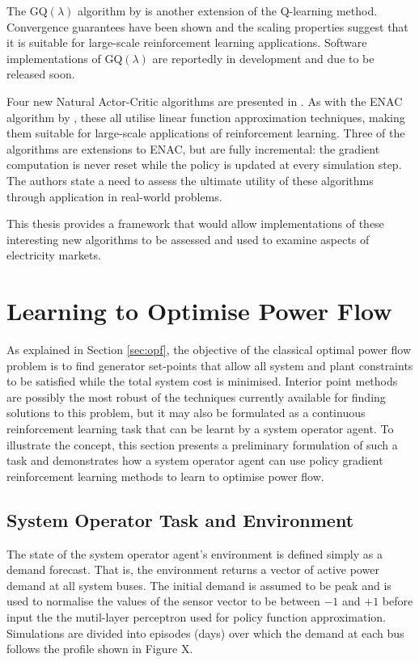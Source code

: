 The GQ$(\lambda)$ algorithm by  is another extension of the
Q-learning method.  Convergence guarantees have been shown and the scaling
properties suggest that it is suitable for large-scale reinforcement learning
applications.  Software implementations of GQ$(\lambda)$ are reportedly in
development and due to be released soon.

Four new Natural Actor-Critic algorithms are presented in .
As with the ENAC algorithm by , these all utilise linear
function approximation techniques, making them suitable for large-scale applications of
reinforcement learning.  Three of the algorithms are extensions to ENAC, but
are fully incremental: the gradient computation is never reset while the policy
is updated at every simulation step.  The authors state a need to assess the
ultimate utility of these algorithms through application in real-world
problems.

This thesis provides a framework that would allow implementations of these
interesting new algorithms to be assessed and used to examine aspects of
electricity markets.

\section{Learning to Optimise Power Flow}
As explained in Section \ref{sec:opf}, the objective of the classical optimal
power flow problem is to find generator set-points that allow all system and
plant constraints to be satisfied while the total system cost is minimised.
Interior point methods are possibly the most robust of the techniques currently
available for finding solutions to this problem, but it may also be
formulated as a continuous reinforcement learning task that can be learnt by a
system operator agent.  To illustrate the concept, this section presents a
preliminary formulation of such a task and demonstrates how a system operator
agent can use policy gradient reinforcement learning methods to learn to
optimise power flow.

\subsection{System Operator Task and Environment}
The state of the system operator agent's environment is defined simply as a
demand forecast.  That is, the environment returns a vector of active power
demand at all system buses.  The initial demand is assumed to be peak and is
used to normalise the values of the sensor vector to be between $-1$ and $+1$
before input the the mutil-layer perceptron used for policy function
approximation.  Simulations are divided into episodes (days) over which the
demand at each bus follows the profile shown in Figure X.

